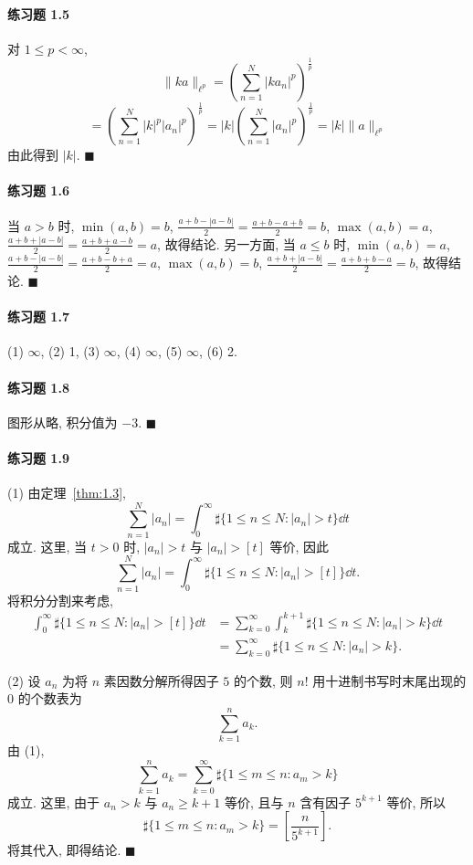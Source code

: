 \paragraph*{练习题 1.5}
对 $1 \leq p < \infty$,
\[
\|ka\|_{\ell^{p}} = \left(\sum_{n=1}^{N}|ka_{n}|^{p}\right)^{\frac{1}{p}}
\]
\[
= \left(\sum_{n=1}^{N}|k|^{p}|a_{n}|^{p}\right)^{\frac{1}{p}} = |k|\left(\sum_{n=1}^{N}|a_{n}|^{p}\right)^{\frac{1}{p}} = |k|\|a\|_{\ell^{p}}
\]
由此得到 $|k|$. $\blacksquare$

\paragraph*{练习题 1.6}
当 $a > b$ 时, $\min(a, b) = b$, $\frac{a+b-|a-b|}{2} = \frac{a+b-a+b}{2} = b$, $\max(a, b) = a$, $\frac{a+b+|a-b|}{2} = \frac{a+b+a-b}{2} = a$, 故得结论. 另一方面, 当 $a \leq b$ 时, $\min(a, b) = a$, $\frac{a+b-|a-b|}{2} = \frac{a+b-b+a}{2} = a$, $\max(a, b) = b$, $\frac{a+b+|a-b|}{2} = \frac{a+b+b-a}{2} = b$, 故得结论. $\blacksquare$

\paragraph*{练习题 1.7}
(1) $\infty$, (2) 1, (3) $\infty$, (4) $\infty$, (5) $\infty$, (6) 2.

\paragraph*{练习题 1.8}
图形从略, 积分值为 $-3$. $\blacksquare$

\paragraph*{练习题 1.9}
(1) 由定理~\ref{thm:1.3},
\[
\sum_{n=1}^{N}|a_{n}| = \int_{0}^{\infty}\sharp\{1 \leq n \leq N: |a_{n}| > t\}\dd t
\]
成立. 这里, 当 $t > 0$ 时, $|a_{n}| > t$ 与 $|a_{n}| > [t]$ 等价, 因此
\[
\sum_{n=1}^{N}|a_{n}| = \int_{0}^{\infty}\sharp\{1 \leq n \leq N: |a_{n}| > [t]\}\dd t.
\]
将积分分割来考虑,
\begin{align*}
\int_{0}^{\infty}\sharp\{1 \leq n \leq N: |a_{n}| > [t]\}\dd t &= \sum_{k=0}^{\infty}\int_{k}^{k+1}\sharp\{1 \leq n \leq N: |a_{n}| > k\}\dd t \\
&= \sum_{k=0}^{\infty}\sharp\{1 \leq n \leq N: |a_{n}| > k\}.
\end{align*}

(2) 设 $a_{n}$ 为将 $n$ 素因数分解所得因子 $5$ 的个数, 则 $n!$ 用十进制书写时末尾出现的 $0$ 的个数表为
\[
\sum_{k=1}^{n}a_{k}.
\]
由 (1),
\[
\sum_{k=1}^{n}a_{k} = \sum_{k=0}^{\infty}\sharp\{1 \leq m \leq n: a_{m} > k\}
\]
成立. 这里, 由于 $a_{n} > k$ 与 $a_{n} \geq k+1$ 等价, 且与 $n$ 含有因子 $5^{k+1}$ 等价, 所以
\[
\sharp\{1 \leq m \leq n: a_{m} > k\} = \left[\frac{n}{5^{k+1}}\right].
\]
将其代入, 即得结论. $\blacksquare$

